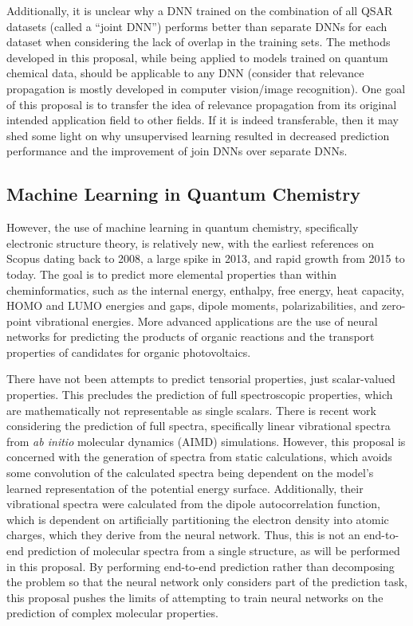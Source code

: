 \documentclass[12pt]{article}
\begin{document}
Additionally, it is unclear why a DNN trained on the combination of all QSAR datasets (called a ``joint DNN'') performs better than separate DNNs for each dataset when considering the lack of overlap in the training sets. The methods developed in this proposal, while being applied to models trained on quantum chemical data, should be applicable to any DNN (consider that relevance propagation is mostly developed in computer vision/image recognition). One goal of this proposal is to transfer the idea of relevance propagation from its original intended application field to other fields. If it is indeed transferable, then it may shed some light on why unsupervised learning resulted in decreased prediction performance and the improvement of join DNNs over separate DNNs.

\subsection{Machine Learning in Quantum Chemistry}
\label{sec:org1a8d543}

However, the use of machine learning in quantum chemistry, specifically electronic structure theory, is relatively new, with the earliest references on Scopus dating back to 2008, a large spike in 2013, and rapid growth from 2015 to today. The goal is to predict more elemental properties than within cheminformatics, such as the internal energy, enthalpy, free energy, heat capacity, HOMO and LUMO energies and gaps, dipole moments, polarizabilities, and zero-point vibrational energies\cite{2015arXiv150204563R}. More advanced applications are the use of neural networks for predicting the products of organic reactions\cite{doi:10.1021/acscentsci.6b00219} and the transport properties of candidates for organic photovoltaics\cite{C5SC04786B}.

There have not been attempts to predict tensorial properties, just scalar-valued properties. This precludes the prediction of full spectroscopic properties, which are mathematically not representable as single scalars. There is recent work considering the prediction of full spectra, specifically linear vibrational spectra from \emph{ab initio} molecular dynamics (AIMD) simulations\cite{2017arXiv170505907G}. However, this proposal is concerned with the generation of spectra from static calculations, which avoids some convolution of the calculated spectra being dependent on the model's learned representation of the potential energy surface. Additionally, their vibrational spectra were calculated from the dipole autocorrelation function, which is dependent on artificially partitioning the electron density into atomic charges, which they derive from the neural network. Thus, this is not an end-to-end \cite{2016arXiv160407316B} prediction of molecular spectra from a single structure, as will be performed in this proposal. By performing end-to-end prediction rather than decomposing the problem so that the neural network only considers part of the prediction task, this proposal pushes the limits of attempting to train neural networks on the prediction of complex molecular properties.
\end{document}
